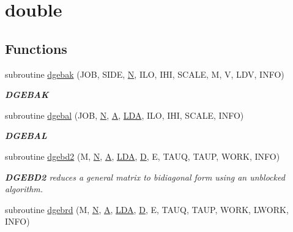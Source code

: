 \hypertarget{group__doubleGEcomputational}{}\section{double}
\label{group__doubleGEcomputational}
\subsection*{Functions}
\begin{DoxyCompactItemize}
\item 
subroutine \hyperlink{group__doubleGEcomputational_ga486d8da01d3304d595dab4cef3353ce6}{dgebak} (J\+O\+B, S\+I\+D\+E, \hyperlink{polmisc_8c_a0240ac851181b84ac374872dc5434ee4}{N}, I\+L\+O, I\+H\+I, S\+C\+A\+L\+E, M, V, L\+D\+V, I\+N\+F\+O)
\begin{DoxyCompactList}\small\item\em {\bfseries D\+G\+E\+B\+A\+K} \end{DoxyCompactList}\item 
subroutine \hyperlink{group__doubleGEcomputational_ga411292dd693c20ff9c27650fb7bddf85}{dgebal} (J\+O\+B, \hyperlink{polmisc_8c_a0240ac851181b84ac374872dc5434ee4}{N}, \hyperlink{classA}{A}, \hyperlink{example__user_8c_ae946da542ce0db94dced19b2ecefd1aa}{L\+D\+A}, I\+L\+O, I\+H\+I, S\+C\+A\+L\+E, I\+N\+F\+O)
\begin{DoxyCompactList}\small\item\em {\bfseries D\+G\+E\+B\+A\+L} \end{DoxyCompactList}\item 
subroutine \hyperlink{group__doubleGEcomputational_ga14ddd93ddf8aa38daf5a0ce1f6052ce3}{dgebd2} (M, \hyperlink{polmisc_8c_a0240ac851181b84ac374872dc5434ee4}{N}, \hyperlink{classA}{A}, \hyperlink{example__user_8c_ae946da542ce0db94dced19b2ecefd1aa}{L\+D\+A}, \hyperlink{odrpack_8h_a7dae6ea403d00f3687f24a874e67d139}{D}, E, T\+A\+U\+Q, T\+A\+U\+P, W\+O\+R\+K, I\+N\+F\+O)
\begin{DoxyCompactList}\small\item\em {\bfseries D\+G\+E\+B\+D2} reduces a general matrix to bidiagonal form using an unblocked algorithm. \end{DoxyCompactList}\item 
subroutine \hyperlink{group__doubleGEcomputational_ga9c735b94f840f927f8085fd23f3ee2e6}{dgebrd} (M, \hyperlink{polmisc_8c_a0240ac851181b84ac374872dc5434ee4}{N}, \hyperlink{classA}{A}, \hyperlink{example__user_8c_ae946da542ce0db94dced19b2ecefd1aa}{L\+D\+A}, \hyperlink{odrpack_8h_a7dae6ea403d00f3687f24a874e67d139}{D}, E, T\+A\+U\+Q, T\+A\+U\+P, W\+O\+R\+K, L\+W\+O\+R\+K, I\+N\+F\+O)

\end{DoxyCompactItemize}

